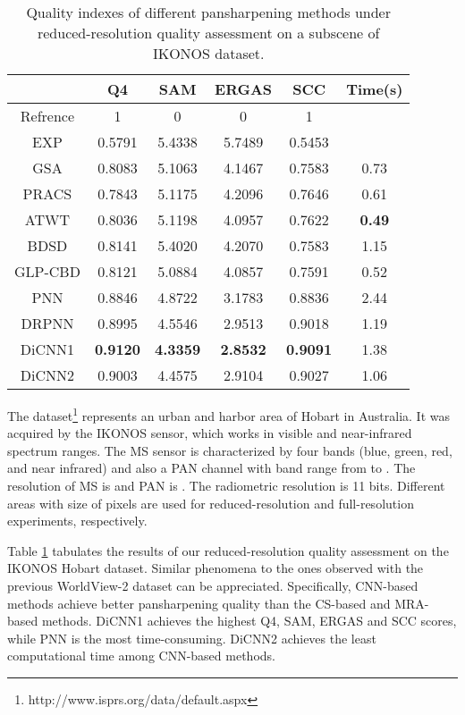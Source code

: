 \documentclass[journal]{IEEEtran}
\begin{document}
\begin{table}[htp]
\small
\caption{Quality indexes of different pansharpening methods under reduced-resolution quality assessment on a  subscene of IKONOS dataset.}
\centering
\begin{tabular}{c|ccccc}
\hline
{}&Q4&SAM& ERGAS &SCC&Time(s)\\
\hline
Refrence&1 &0 &0 &1&{}\\
\hline
\hline
EXP &0.5791 &5.4338 &5.7489 &0.5453 &{}\\
\hline
GSA&0.8083 &5.1063 &4.1467 &0.7583 &0.73\\
\hline
PRACS&0.7843 &5.1175 &4.2096 &0.7646 &0.61\\
\hline
ATWT&0.8036 &5.1198 &4.0957 &0.7622  &\textbf{0.49}\\
\hline
BDSD&0.8141 &5.4020 &4.2070 &0.7583 &1.15\\
\hline
GLP-CBD&0.8121 &5.0884 &4.0857 &0.7591 &0.52\\
\hline
\hline
PNN &0.8846 &4.8722 &3.1783 &0.8836&2.44\\
\hline
DRPNN &0.8995 &4.5546 &2.9513 &0.9018&1.19\\
\hline
DiCNN1 &\textbf{0.9120} &\textbf{4.3359} &\textbf{2.8532} &\textbf{0.9091}&1.38\\
\hline
DiCNN2 &0.9003 &4.4575 &2.9104 &0.9027&1.06\\
\hline
\end{tabular}
\label{table:reduceik}
\end{table}

The dataset\footnote{http://www.isprs.org/data/default.aspx} represents an urban and harbor area of Hobart in Australia. It was acquired by the IKONOS sensor, which works in visible and near-infrared spectrum ranges. The MS sensor is characterized by four bands (blue, green, red, and near infrared) and also a PAN channel with band range from  to . The resolution of MS is  and PAN is . The radiometric resolution is 11 bits. Different areas with size of  pixels are used for reduced-resolution and full-resolution experiments, respectively.

Table \ref{table:reduceik} tabulates the results of our reduced-resolution quality assessment on the IKONOS Hobart dataset. Similar phenomena to the ones observed with the previous WorldView-2 dataset can be appreciated. Specifically, CNN-based methods achieve better pansharpening quality than the CS-based and MRA-based methods. DiCNN1 achieves the highest Q4, SAM, ERGAS and SCC scores, while PNN is the most time-consuming. DiCNN2 achieves the least computational time among CNN-based methods.
\end{document}

